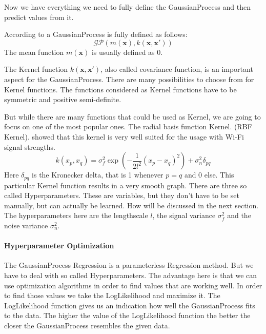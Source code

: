 Now we have everything we need to fully define the \Gls{GaussianProcess} and then predict values from it. 

According to \citet[p. 13]{Rasmussen:2005:GPM:1162254} a \Gls{GaussianProcess} is fully defined as follows:
\begin{equation}\label{eq:GP}
\mathcal{GP}(m(\mathbf{x}),k(\mathbf{x},\mathbf{x'}))
\end{equation}
The mean function $m(\mathbf{x})$ is usually defined as 0. 

The \gls{Kernel} function $k(\mathbf{x},\mathbf{x'})$, also called covariance function, is an important aspect for the \Gls{GaussianProcess}. There are many possibilities to choose from for \gls{Kernel} functions. The functions considered as \gls{Kernel} functions have to be symmetric and positive semi-definite. 

But while there are many functions that could be used as \gls{Kernel}, we are going to focus on one of the most popular ones. The radial basis function \gls{Kernel}. (RBF \gls{Kernel}). \citet{ferris2006gaussian} showed that this kernel is very well suited for the usage with Wi-Fi signal strengths. 
\begin{equation}\label{eq:rbf}
k(x_p,x_q) = \sigma_f^2\exp(-\dfrac{1}{2l^2}(x_p-x_q)^2)+\sigma_n^2\delta_{pq}
\end{equation} 
Here $\delta_{pq}$ is the Kronecker delta, that is 1 whenever $p=q$ and 0 else. This particular \gls{Kernel} function results in a very smooth graph. There are three so called \gls{Hyperparameter}s. These are variables, but they don't have to be set manually, but can actually be learned. How will be discussed in the next section. 
The hyperparameters here are the lengthscale $l$, the signal variance $\sigma_f^2$ and the noise variance $\sigma_n^2$. 

\paragraph{Hyperparameter Optimization}
The \Gls{GaussianProcess} \gls{Regression} is a parameterless \gls{Regression} method. But we have to deal with so called \gls{Hyperparameter}s. The advantage here is that we can use optimization algorithms in order to find values that are working well. In order to find those values we take the \gls{LogLikelihood} and maximize it. The \gls{LogLikelihood} function gives us an indication how well the \Gls{GaussianProcess} fits to the data. The higher the value of the \gls{LogLikelihood} function the better the closer the \Gls{GaussianProcess} resembles the given data.

